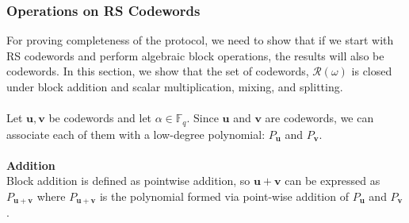 \documentclass[10pt,letterpaper,titlepage]{article}
\newcommand{\GF}[1]{\mathbb{F}_{#1}}
\newcommand{\w}[0]{\omega}
\theoremstyle{definition}
\begin{document}
\begin{appendices}
\subsubsection{Operations on RS Codewords}
\label{RS operations}
For proving completeness of the protocol, we need to show that if we start with RS codewords and perform algebraic block operations, the results will also be codewords.
In this section, we show that the set of codewords, $\mathcal{R}(\w)$ is closed under block addition and scalar multiplication, mixing, and splitting. \\
\\
Let $\mathbf{u},\mathbf{v}$ be codewords and let $\alpha\in\GF{q}$.
Since $\mathbf{u}$ and $\mathbf{v}$ are codewords, we can associate each of them with a low-degree polynomial: $P_\mathbf{u}$ and $P_\mathbf{v}$.\\
\\
\textbf{Addition}\\
Block addition is defined as pointwise addition, so $\mathbf{u}+\mathbf{v}$ can be expressed as $P_{\mathbf{u}+\mathbf{v}}$ where $P_{\mathbf{u}+\mathbf{v}}$ is the polynomial formed via point-wise addition of $P_\mathbf{u}$ and $P_\mathbf{v}$.


\end{appendices}
\end{document}
